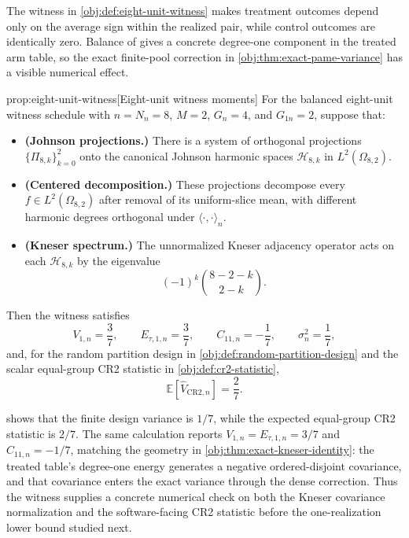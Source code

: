 
The witness in \cref{obj:def:eight-unit-witness} makes treatment outcomes depend only on the average sign within the realized pair, while control outcomes are identically zero. Balance of  gives a concrete degree-one component in the treated arm table, so the exact finite-pool correction in \cref{obj:thm:exact-pame-variance} has a visible numerical effect.

\begin{propositionv}{prop:eight-unit-witness}[Eight-unit witness moments]
For the balanced eight-unit witness schedule with \(n=N_n=8\), \(M=2\), \(G_n=4\), and \(G_{1n}=2\), suppose that:
\begin{itemize}
\item \textbf{(Johnson projections.)} There is a system of orthogonal projections \(\{\Pi_{8,k}\}_{k=0}^2\) onto the canonical Johnson harmonic spaces \(\mathcal H_{8,k}\) in \(L^2(\Omega_{8,2})\).
\item \textbf{(Centered decomposition.)} These projections decompose every \(f\in L^2(\Omega_{8,2})\) after removal of its uniform-slice mean, with different harmonic degrees orthogonal under \(\langle\cdot,\cdot\rangle_n\).
\item \textbf{(Kneser spectrum.)} The unnormalized Kneser adjacency operator acts on each \(\mathcal H_{8,k}\) by the eigenvalue
\[
(-1)^k {8-2-k \choose 2-k}.
\]
\end{itemize}
Then the witness satisfies
\[
V_{1,n}=\frac{3}{7},\qquad
E_{\tau,1,n}=\frac{3}{7},\qquad
C_{11,n}=-\frac{1}{7},\qquad
\sigma_n^2=\frac{1}{7},
\]
and, for the random partition design in \cref{obj:def:random-partition-design} and the scalar equal-group CR2 statistic in \cref{obj:def:cr2-statistic},
\[
\mathbb E\!\left[\widehat V_{\mathrm{CR2},n}\right]=\frac{2}{7}.
\]
\end{propositionv}

 shows that the finite design variance is \(1/7\), while the expected equal-group CR2 statistic is \(2/7\). The same calculation reports \(V_{1,n}=E_{\tau,1,n}=3/7\) and \(C_{11,n}=-1/7\), matching the geometry in \cref{obj:thm:exact-kneser-identity}: the treated table's degree-one energy generates a negative ordered-disjoint covariance, and that covariance enters the exact variance through the dense correction. Thus the witness supplies a concrete numerical check on both the Kneser covariance normalization and the software-facing CR2 statistic before the one-realization lower bound studied next.
